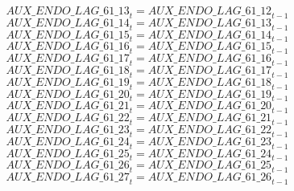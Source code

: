 \begin{dmath}
{AUX\_ENDO\_LAG\_61\_13}_{t}={AUX\_ENDO\_LAG\_61\_12}_{t-1}
\end{dmath}
\begin{dmath}
{AUX\_ENDO\_LAG\_61\_14}_{t}={AUX\_ENDO\_LAG\_61\_13}_{t-1}
\end{dmath}
\begin{dmath}
{AUX\_ENDO\_LAG\_61\_15}_{t}={AUX\_ENDO\_LAG\_61\_14}_{t-1}
\end{dmath}
\begin{dmath}
{AUX\_ENDO\_LAG\_61\_16}_{t}={AUX\_ENDO\_LAG\_61\_15}_{t-1}
\end{dmath}
\begin{dmath}
{AUX\_ENDO\_LAG\_61\_17}_{t}={AUX\_ENDO\_LAG\_61\_16}_{t-1}
\end{dmath}
\begin{dmath}
{AUX\_ENDO\_LAG\_61\_18}_{t}={AUX\_ENDO\_LAG\_61\_17}_{t-1}
\end{dmath}
\begin{dmath}
{AUX\_ENDO\_LAG\_61\_19}_{t}={AUX\_ENDO\_LAG\_61\_18}_{t-1}
\end{dmath}
\begin{dmath}
{AUX\_ENDO\_LAG\_61\_20}_{t}={AUX\_ENDO\_LAG\_61\_19}_{t-1}
\end{dmath}
\begin{dmath}
{AUX\_ENDO\_LAG\_61\_21}_{t}={AUX\_ENDO\_LAG\_61\_20}_{t-1}
\end{dmath}
\begin{dmath}
{AUX\_ENDO\_LAG\_61\_22}_{t}={AUX\_ENDO\_LAG\_61\_21}_{t-1}
\end{dmath}
\begin{dmath}
{AUX\_ENDO\_LAG\_61\_23}_{t}={AUX\_ENDO\_LAG\_61\_22}_{t-1}
\end{dmath}
\begin{dmath}
{AUX\_ENDO\_LAG\_61\_24}_{t}={AUX\_ENDO\_LAG\_61\_23}_{t-1}
\end{dmath}
\begin{dmath}
{AUX\_ENDO\_LAG\_61\_25}_{t}={AUX\_ENDO\_LAG\_61\_24}_{t-1}
\end{dmath}
\begin{dmath}
{AUX\_ENDO\_LAG\_61\_26}_{t}={AUX\_ENDO\_LAG\_61\_25}_{t-1}
\end{dmath}
\begin{dmath}
{AUX\_ENDO\_LAG\_61\_27}_{t}={AUX\_ENDO\_LAG\_61\_26}_{t-1}
\end{dmath}
